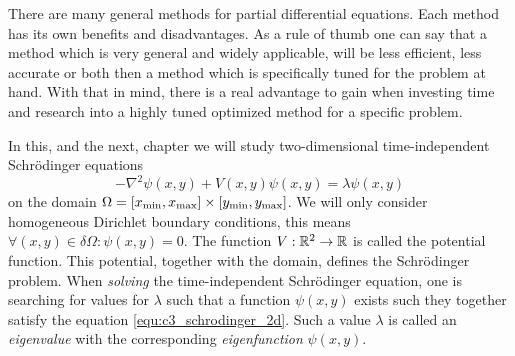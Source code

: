 


\label{cha:c3}

There are many general methods for partial differential equations. Each method has its own benefits and disadvantages. As a rule of thumb one can say that a method which is very general and widely applicable, will be less efficient, less accurate or both then a method which is specifically tuned for the problem at hand. With that in mind, there is a real advantage to gain when investing time and research into a highly tuned optimized method for a specific problem.

In this, and the next, chapter we will study two-dimensional time-independent Schrödinger equations
\begin{equation}\label{equ:c3_schrodinger_2d}
    -\nabla^2\psi(x, y) + V(x, y) \psi(x, y) = \lambda \psi(x, y)
\end{equation}
on the domain $\Omega = [{x_{\text{min}}}, {x_{\text{max}}}]\times[{y_{\text{min}}}, {y_{\text{max}}}]$. We will only consider homogeneous Dirichlet boundary conditions, this means $\forall (x, y) \in \delta\Omega : \psi(x, y) = 0$. The function $V: \mathbb{R}^2 \to \mathbb{R}$ is called the potential function. This potential, together with the domain, defines the Schrödinger problem. When \emph{solving} the time-independent Schrödinger equation, one is searching for values for $\lambda$ such that a function $\psi(x, y)$  exists such they together satisfy the equation \eqref{equ:c3_schrodinger_2d}. Such a value $\lambda$ is called an \emph{eigenvalue} with the corresponding \emph{eigenfunction} $\psi(x, y)$.

